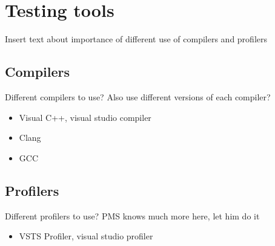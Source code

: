 \section{Testing tools}
Insert text about importance of different use of compilers and profilers

\subsection{Compilers}
Different compilers to use?
Also use different versions of each compiler?

\begin{itemize}

    \item
    Visual C++, visual studio compiler
    
    \item
    Clang

    \item
    GCC

\end{itemize}


\subsection{Profilers}
Different profilers to use?
PMS knows much more here, let him do it

\begin{itemize}

    \item
    VSTS Profiler, visual studio profiler

\end{itemize}